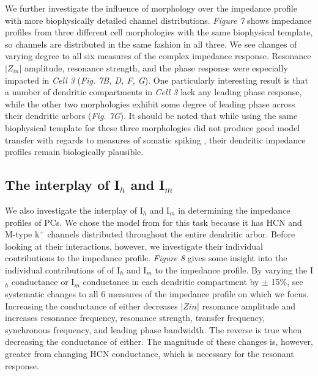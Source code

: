 \documentclass[utf8]{frontiersSCNS} %
\begin{document}
We further investigate the influence of morphology over the impedance profile with more biophysically
detailed channel distributions.
\emph{Figure 7} shows impedance profiles from three different cell morphologies with the same biophysical template, so channels are
distributed in the same fashion in all three.
We see changes of varying degree to all six measures of the complex impedance response.
Resonance $|Z_{in}|$ amplitude, resonance strength, and the phase response were especially impacted in \emph{Cell 3} (\emph{Fig. 7B, D, F, G}).
One particularly interesting result is that a number of dendritic compartments in \emph{Cell 3} lack any leading phase response, 
while the other two morphologies exhibit some degree of leading phase across their dendritic arbors (\emph{Fig. 7G}).
It should be noted that while using the same biophysical template for these three morphologies did not produce
good model transfer with regards to measures of somatic spiking \citep{Hay2011-if},
their dendritic impedance profiles remain biologically plausible.
\\
\subsection{The interplay of I$_h$ and I$_m$}
We also investigate the interplay of I$_h$ and I$_m$ in determining the impedance profiles of PCs.
We chose the model from \cite{Kole2008-aj} for this task because it has HCN and M-type k$^+$ channels distributed
throughout the entire dendritic arbor.
Before looking at their interactions, however, we investigate their individual contributions to the impedance profile.
\emph{Figure 8} gives some insight into the individual contributions of of I$_h$ and I$_m$ to the impedance profile.
By varying the I$_h$ conductance or I$_m$ conductance in each dendritic compartment by $\pm$ 15\%, see systematic 
changes to all 6 measures of the impedance profile on which we focus.  Increasing the conductance of either decreases
$|Zin|$ resonance amplitude and increases resonance frequency, resonance strength, transfer frequency, synchronous
frequency, and leading phase bandwidth.
The reverse is true when decreasing the conductance of either.
The magnitude of these changes is, however, greater from changing HCN conductance, which is necessary for the resonant response.
\end{document}
